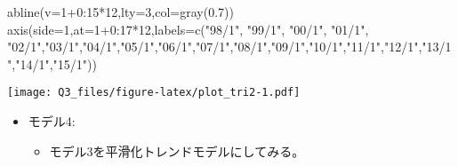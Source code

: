 \documentclass[]{article}
\newenvironment{Shaded}{\begin{snugshade}}{\end{snugshade}}
\newcommand{\AttributeTok}[1]{\textcolor[rgb]{0.77,0.63,0.00}{#1}}
\newcommand{\DecValTok}[1]{\textcolor[rgb]{0.00,0.00,0.81}{#1}}
\newcommand{\FloatTok}[1]{\textcolor[rgb]{0.00,0.00,0.81}{#1}}
\newcommand{\FunctionTok}[1]{\textcolor[rgb]{0.00,0.00,0.00}{#1}}
\newcommand{\NormalTok}[1]{#1}
\newcommand{\SpecialCharTok}[1]{\textcolor[rgb]{0.00,0.00,0.00}{#1}}
\newcommand{\StringTok}[1]{\textcolor[rgb]{0.31,0.60,0.02}{#1}}
\providecommand{\tightlist}{%
  \setlength{\itemsep}{0pt}\setlength{\parskip}{0pt}}
\begin{document}
\begin{Shaded}
\begin{Highlighting}[]
\FunctionTok{abline}\NormalTok{(}\AttributeTok{v=}\DecValTok{1}\SpecialCharTok{+}\DecValTok{0}\SpecialCharTok{:}\DecValTok{15}\SpecialCharTok{*}\DecValTok{12}\NormalTok{,}\AttributeTok{lty=}\DecValTok{3}\NormalTok{,}\AttributeTok{col=}\FunctionTok{gray}\NormalTok{(}\FloatTok{0.7}\NormalTok{))}
\FunctionTok{axis}\NormalTok{(}\AttributeTok{side=}\DecValTok{1}\NormalTok{,}\AttributeTok{at=}\DecValTok{1}\SpecialCharTok{+}\DecValTok{0}\SpecialCharTok{:}\DecValTok{17}\SpecialCharTok{*}\DecValTok{12}\NormalTok{,}\AttributeTok{labels=}\FunctionTok{c}\NormalTok{(}\StringTok{"98/1"}\NormalTok{, }\StringTok{"99/1"}\NormalTok{, }\StringTok{"00/1"}\NormalTok{, }\StringTok{"01/1"}\NormalTok{, }\StringTok{"02/1"}\NormalTok{,}\StringTok{"03/1"}\NormalTok{,}\StringTok{"04/1"}\NormalTok{,}\StringTok{"05/1"}\NormalTok{,}\StringTok{"06/1"}\NormalTok{,}\StringTok{"07/1"}\NormalTok{,}\StringTok{"08/1"}\NormalTok{,}\StringTok{"09/1"}\NormalTok{,}\StringTok{"10/1"}\NormalTok{,}\StringTok{"11/1"}\NormalTok{,}\StringTok{"12/1"}\NormalTok{,}\StringTok{"13/1"}\NormalTok{,}\StringTok{"14/1"}\NormalTok{,}\StringTok{"15/1"}\NormalTok{))}
\end{Highlighting}
\end{Shaded}

\texttt{[image: Q3\_files/figure-latex/plot\_tri2-1.pdf]}

\begin{itemize}
\tightlist
\item
  モデル4:

  \begin{itemize}
  \tightlist
  \item
    モデル3を平滑化トレンドモデルにしてみる。
  \end{itemize}
\end{itemize}
\end{document}
